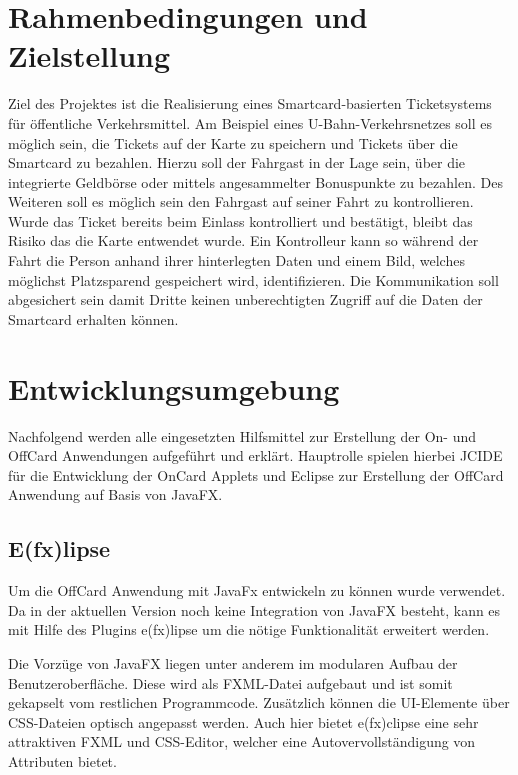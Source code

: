 \documentclass[	a4paper,
			11pt,
			oneside,
			parskip]{scrartcl}
\begin{document}
\setlength{\parindent}{0pt} 
\onehalfspacing

\tableofcontents 
\clearpage
{}

\section{Rahmenbedingungen und Zielstellung}

Ziel des Projektes ist die Realisierung eines Smartcard-basierten Ticketsystems für öffentliche Verkehrsmittel. Am Beispiel eines U-Bahn-Verkehrsnetzes soll es möglich sein, die Tickets auf der Karte zu speichern und Tickets über die Smartcard zu bezahlen. Hierzu soll der Fahrgast in der Lage sein, über die integrierte Geldbörse oder mittels angesammelter Bonuspunkte zu bezahlen. Des Weiteren soll es möglich sein den Fahrgast auf seiner Fahrt zu kontrollieren. Wurde das Ticket bereits beim Einlass kontrolliert und bestätigt, bleibt das Risiko das die Karte entwendet wurde. Ein Kontrolleur kann so während der Fahrt die Person anhand ihrer hinterlegten Daten und einem Bild, welches möglichst Platzsparend gespeichert wird, identifizieren. Die Kommunikation soll abgesichert sein damit Dritte keinen unberechtigten Zugriff auf die Daten der Smartcard erhalten können.

\section{Entwicklungsumgebung}

Nachfolgend werden alle eingesetzten Hilfsmittel zur Erstellung der On- und OffCard Anwendungen aufgeführt und erklärt. Hauptrolle spielen hierbei JCIDE für die Entwicklung der OnCard Applets und Eclipse zur Erstellung der OffCard Anwendung auf Basis von JavaFX.

\subsection{E(fx)lipse}

Um die OffCard Anwendung mit JavaFx entwickeln zu können wurde  verwendet. Da in der aktuellen Version noch keine Integration von JavaFX besteht, kann es mit Hilfe des Plugins e(fx)lipse um die nötige Funktionalität erweitert werden.\medskip

Die Vorzüge von JavaFX liegen unter anderem im modularen Aufbau der Benutzeroberfläche. Diese wird als FXML-Datei aufgebaut und ist somit gekapselt vom restlichen Programmcode. Zusätzlich
können die UI-Elemente über CSS-Dateien optisch angepasst werden. Auch hier bietet e(fx)clipse eine sehr attraktiven FXML und CSS-Editor, welcher eine Autovervollständigung von Attributen bietet. 
\end{document}
